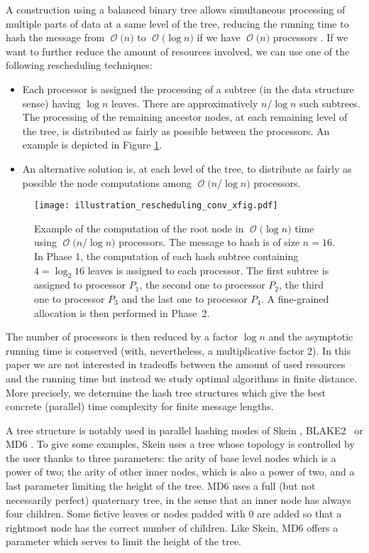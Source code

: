 \documentclass{llncs}
\newcommand{\BigO}[1]{\ensuremath{\operatorname{\mathcal{O}}\bigl(#1\bigr)}}
\begin{document}
A construction using a balanced binary tree allows simultaneous processing of multiple parts of data 
at a same level of the tree, 
reducing the running time to hash the message from $\BigO{n}$ to $\BigO{\log n}$ 
if we have $\BigO{n}$ processors \cite{Dam90,Mer80}. If we want to further reduce
the amount of resources involved, we can use one of the following rescheduling techniques:
\begin{itemize}
 \item Each processor is assigned the processing of a subtree (in the data structure sense) having $\log n$ leaves. 
 There are approximatively $n/\log n$ such subtrees. 
The processing of the remaining ancestor nodes, at each remaining level of the tree, is distributed as fairly as possible
between the processors. An example is depicted in Figure \ref{resch_technique}.

 \item An alternative solution is, at each level of the tree, to distribute as fairly as possible the node computations among
$\BigO{n/\log n}$ processors.
\end{itemize}

\begin{figure}[htbp]
\begin{center}
\texttt{[image: illustration\_rescheduling\_conv\_xfig.pdf]}
\caption{Example of the computation of the root node in $\BigO{\log n}$ time using $\BigO{n/\log n}$ processors. The message
to hash is of size $n=16$. In Phase 1, the computation of each hash subtree containing $4=\log_2 16$ leaves is assigned to each processor. The first 
subtree is assigned to processor $P_1$, the second one to processor $P_2$, the third one to processor $P_3$ and the last one to processor $P_4$. A fine-grained allocation
is then performed in Phase~2.}
\label{resch_technique}
\end{center}
\end{figure}

The number of processors is then reduced by a factor $\log n$ and
the asymptotic running time is conserved (with, nevertheless, a multiplicative factor 2).
In this paper we are not interested in tradeoffs between
the amount of used resources and the running time but instead we study optimal algorithms in finite distance.
More precisely, we determine the hash tree structures which give the best concrete (parallel) time complexity for finite message lengths.


A tree structure is notably used in parallel hashing modes of Skein \cite{FLSWBKCW09}, BLAKE2~\cite{ANWW13} or MD6 \cite{RABCDEKKLRSSSTY08}. 
To give some examples, Skein uses a tree whose topology is controlled by the user thanks to three parameters:
the arity of base level nodes which is a power of two; the arity of other inner nodes,
which is also a power of two, and a last parameter limiting the height of the tree.
MD6 uses a full (but not necessarily perfect) quaternary tree, in the sense that an inner node has always four children.
Some fictive leaves or nodes padded with 0 are added so that a rightmost node has the correct number of children. 
Like Skein, MD6 offers a parameter which serves to limit the height of the tree.
\end{document}
